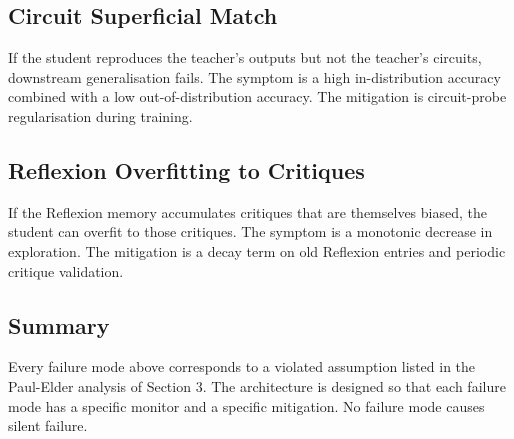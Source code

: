 \subsection{Circuit Superficial Match}
If the student reproduces the teacher's outputs but not the teacher's circuits, downstream generalisation fails. The symptom is a high in-distribution accuracy combined with a low out-of-distribution accuracy. The mitigation is circuit-probe regularisation during training.

\subsection{Reflexion Overfitting to Critiques}
If the Reflexion memory accumulates critiques that are themselves biased, the student can overfit to those critiques. The symptom is a monotonic decrease in exploration. The mitigation is a decay term on old Reflexion entries and periodic critique validation.

\subsection{Summary}
Every failure mode above corresponds to a violated assumption listed in the Paul-Elder analysis of Section 3. The architecture is designed so that each failure mode has a specific monitor and a specific mitigation. No failure mode causes silent failure.

